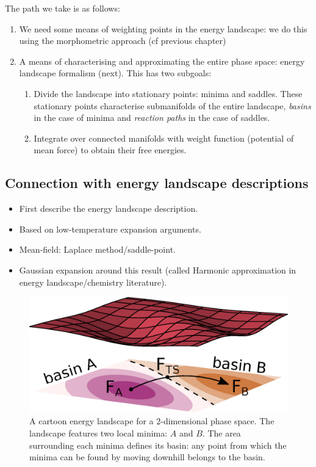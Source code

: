\documentclass[11pt,twoside]{report}
\begin{document}
The path we take is as follows:
\begin{enumerate}
\item We need some means of weighting points in the energy landscape: we do this using the morphometric approach (cf previous chapter)
\item A means of characterising and approximating the entire phase space: energy landscape formalism (next). This has two subgoals:
  \begin{enumerate}
  \item Divide the landscape into stationary points: minima and saddles.
    These stationary points characterise submanifolds of the entire landscape, \emph{basins} in the case of minima and \emph{reaction paths} in the case of saddles.
  \item Integrate over connected manifolds with weight function (potential of mean force) to obtain their free energies.
  \end{enumerate}
\end{enumerate}


\subsection{Connection with energy landscape descriptions}

\begin{itemize}
  \item First describe the energy landscape description.
  \item Based on low-temperature expansion arguments.
  \item Mean-field: Laplace method/saddle-point.
  \item Gaussian expansion around this result (called Harmonic approximation in energy landscape/chemistry literature).
\end{itemize}

\begin{figure}
  \includegraphics[width=\linewidth,outer]{toy-landscape}
  \caption{A cartoon energy landscape for a 2-dimensional phase space.
    The landscape features two local minima: $A$ and $B$.
    The area surrounding each minima defines its basin: any point from which the minima can be found by moving downhill belongs to the basin.}
\end{figure}
\end{document}
